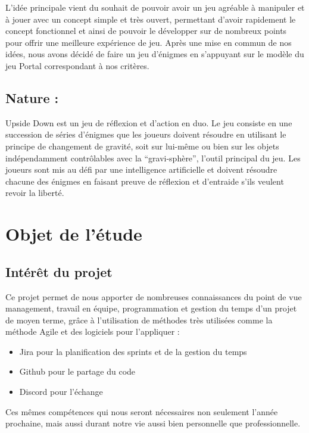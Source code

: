\documentclass[a4paper,11pt]{article}
\begin{document}
	L’idée principale vient du souhait de pouvoir avoir un jeu agréable à manipuler 
    et à jouer avec un concept simple et très ouvert, permettant d’avoir rapidement le concept fonctionnel et ainsi de pouvoir le développer sur de nombreux points pour offrir une meilleure expérience de jeu. Après une mise en commun de nos idées, nous avons décidé de faire un jeu d’énigmes en s’appuyant sur le modèle du jeu Portal correspondant à nos critères.	

    \subsection{Nature :}
	Upside Down est un jeu de réflexion et d'action en duo.
Le jeu consiste en une succession de séries d'énigmes que les joueurs doivent 
résoudre en utilisant le principe de changement de gravité, soit sur lui-même ou bien sur les objets indépendamment contrôlables avec la “gravi-sphère”, l’outil principal du jeu. Les joueurs sont mis au défi par une intelligence artificielle et doivent résoudre chacune des énigmes en faisant preuve de réflexion et d'entraide s'ils veulent revoir la liberté.

\section{Objet de l’étude}

\subsection{Intérêt du projet}
Ce projet permet de nous apporter de nombreuses connaissances du point de vue management, 
travail en équipe, programmation et gestion du temps d’un projet de moyen terme, 
grâce à l’utilisation de méthodes très utilisées comme la méthode Agile et des logiciels pour l’appliquer : \newline

\begin{itemize}
    \item Jira pour la planification des sprints et de la gestion du temps
    \item Github pour le partage du code
    \item Discord pour l’échange\newline
\end{itemize}

Ces mêmes compétences qui nous seront nécessaires non seulement 
l’année prochaine, mais aussi durant notre vie aussi bien personnelle que professionnelle.
\end{document}
